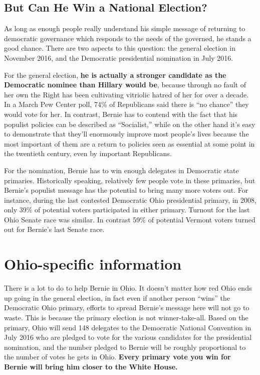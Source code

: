 \documentclass[notumble]{leaflet}
\begin{document}
\subsection*{But Can He Win a National Election?}

As long as enough people really understand his simple message of
returning to democratic governance which responds to the needs of the
governed, he stands a good chance.  There are two aspects to this
question: the general election in November 2016, and the Democratic
presidential nomination in July 2016.

For the general election, {\bf he is actually a stronger candidate as
  the Democratic nominee than Hillary would be}, because through no
fault of her own the Right has been cultivating vitriolic hatred of
her for over a decade.  In a March Pew Center poll, 74\% of
Republicans said there is ``no chance'' they would vote for her.  In
contrast, Bernie has to contend with the fact that his populist
policies can be described as ``Socialist,'' while on the other hand
it's easy to demonstrate that they'll enormously improve most people's
lives because the most important of them are a return to policies seen
as essential at some point in the twentieth century, even by important
Republicans.

For the nomination, Bernie has to win enough delegates in Democratic
state primaries.  Historically speaking, relatively few people vote in
these primaries, but Bernie's populist message has the potential to
bring many more voters out.  For instance, during the last contested
Democratic Ohio presidential primary, in 2008, only 39\% of potential
voters participated in either primary.  Turnout for the last Ohio
Senate race was similar.  In contrast 59\% of potential Vermont voters
turned out for Bernie's last Senate race.

\pagebreak

\section*{Ohio-specific information}

There is a lot to do to help Bernie in Ohio.  It doesn't matter how
red Ohio ends up going in the general election, in fact even if
another person ``wins'' the Democratic Ohio primary, efforts to spread
Bernie's message here will not go to waste.  This is because the
primary election is not winner-take-all.  Based on the primary, Ohio
will send 148 delegates to the Democratic National Convention in July
2016 who are pledged to vote for the various candidates for the
presidential nomination, and the number pledged to Bernie will be
roughly proportional to the number of votes he gets in Ohio.  {\bf
  Every primary vote you win for Bernie will bring him closer to the
  White House.}
\end{document}
